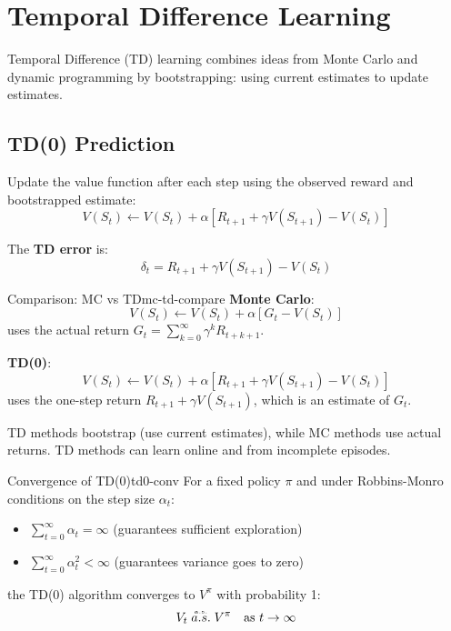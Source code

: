 \documentclass[a4paper, 11pt]{article}
\numberwithin{equation}{section}
\theoremstyle{plain}
\theoremstyle{definition}
\newcommand{\1}{{\mathbbm 1}}
\begin{document}
	\section{Temporal Difference Learning}
	
	Temporal Difference (TD) learning combines ideas from Monte Carlo and dynamic programming by bootstrapping: using current estimates to update estimates.
	
	\subsection{TD(0) Prediction}
	
	Update the value function after each step using the observed reward and bootstrapped estimate:
	\begin{equation}\label{td0-update}
		V(S_t) \leftarrow V(S_t) + \alpha [R_{t+1} + \gamma V(S_{t+1}) - V(S_t)]
	\end{equation}
	
	The \textbf{TD error} is:
	\begin{equation}
		\delta_t = R_{t+1} + \gamma V(S_{t+1}) - V(S_t)
	\end{equation}
	
	\begin{frema}{Comparison: MC vs TD}{mc-td-compare}
		\textbf{Monte Carlo}:
		\begin{equation*}
			V(S_t) \leftarrow V(S_t) + \alpha [G_t - V(S_t)]
		\end{equation*}
		uses the actual return $G_t = \sum_{k=0}^{\infty} \gamma^k R_{t+k+1}$.
		
		\textbf{TD(0)}:
		\begin{equation*}
			V(S_t) \leftarrow V(S_t) + \alpha [R_{t+1} + \gamma V(S_{t+1}) - V(S_t)]
		\end{equation*}
		uses the one-step return $R_{t+1} + \gamma V(S_{t+1})$, which is an estimate of $G_t$.
		
		TD methods bootstrap (use current estimates), while MC methods use actual returns. TD methods can learn online and from incomplete episodes.
	\end{frema}
	
	\begin{ftheo}{Convergence of TD(0)}{td0-conv}
		For a fixed policy $\pi$ and under Robbins-Monro conditions on the step size $\alpha_t$:
		\begin{itemize}
			\item $\sum_{t=0}^{\infty} \alpha_t = \infty$ (guarantees sufficient exploration)
			\item $\sum_{t=0}^{\infty} \alpha_t^2 < \infty$ (guarantees variance goes to zero)
		\end{itemize}
		the TD(0) algorithm converges to $V^{\pi}$ with probability 1:
		\begin{equation}
			V_t \tos[a.s.] V^{\pi} \quad \text{as } t \to \infty
		\end{equation}
	\end{ftheo}
	
\end{document}
